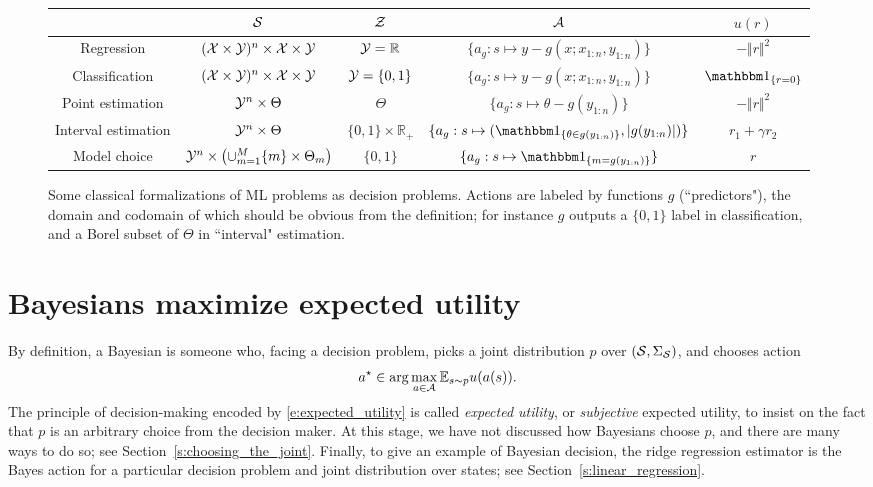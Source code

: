 \begin{figure}
    \centering
    \begin{tabular}{| c | c | c | c | c |}
        \hline
        & $\mathcal{S}$ & $\mathcal{Z}$  & $\mathcal{A}$ & $u(r)$ \\
        \hline
        \hline
        Regression & $(\mathcal{X}\times \mathcal{Y})^n \times \mathcal{X}\times \mathcal{Y}$ & $\mathcal{Y}=\mathbb{R}$ &   
        $\{a_g:s\mapsto y-g(x;x_{1:n},y_{1:n})\}$ & $-\Vert r\Vert^2$ \\
        Classification & $(\mathcal{X}\times \mathcal{Y})^n \times \mathcal{X}\times \mathcal{Y}$  &$\mathcal{Y}=\{0,1\}$ &   
        $\{a_g:s\mapsto y-g(x;x_{1:n},y_{1:n})\}$ & $\IND{r = 0}$ \\
        Point estimation & $\mathcal{Y}^n\times\Theta$ & $\Theta$& $\{a_g:s\mapsto \theta-g(y_{1:n})\}$ & $- \Vert r\Vert^2$\\
        Interval estimation & $\mathcal{Y}^n\times\Theta$ & $\{0,1\}\times \mathbb{R}_+$ & $\{a_g:s\mapsto (\IND{\theta\in g(y_{1:n})}, \vert g(y_{1:n})\vert)\}$ &  $r_1+\gamma r_2$ \\
        Model choice & $\mathcal{Y}^n\times \left (\cup_{m=1}^M \{m\}\times\Theta_m \right )$ &  $\{0,1\}$ & $\{a_g:s\mapsto \IND{m= g(y_{1:n})}\}$ & $r$ \\
        \hline
    \end{tabular}
    \label{f:decision_problems}
    \caption{Some classical formalizations of ML problems as decision problems. Actions are labeled by functions $g$ (``predictors"), the domain and codomain of which should be obvious from the definition; for instance $g$ outputs a $\{0,1\}$ label in classification, and a Borel subset of $\Theta$ in ``interval" estimation.}
\end{figure}

\section{Bayesians maximize expected utility}

By definition, a Bayesian is someone who, facing a decision problem, picks a joint distribution $p$ over $(\mathcal{S}, \Sigma_{\mathcal{S}})$, and chooses action
\begin{equation}
    a^\star \in \arg\max_{a\in\mathcal{A}} \mathbb{E}_{s\sim p} u(a(s)).
    \label{e:expected_utility}
\end{equation}
The principle of decision-making encoded by \eqref{e:expected_utility} is called \emph{expected utility}, or \emph{subjective} expected utility, to insist on the fact that $p$ is an arbitrary choice from the decision maker.
At this stage, we have not discussed how Bayesians choose $p$, and there are many ways to do so; see Section~\ref{s:choosing_the_joint}.
Finally, to give an example of Bayesian decision, the ridge regression estimator is the Bayes action for a particular decision problem and joint distribution over states; see Section~\ref{s:linear_regression}.

